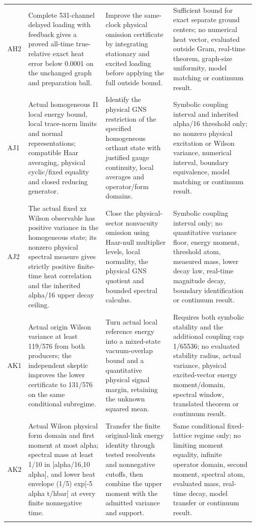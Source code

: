 \begin{longtable}{@{}>{\raggedright\arraybackslash}p{13mm}>{\raggedright\arraybackslash}p{52mm}>{\raggedright\arraybackslash}p{35mm}>{\raggedright\arraybackslash}p{48mm}@{}}
AH2 & Complete 531-channel delayed loading with feedback gives a proved all-time true-relative exact heat error below 0.0001 on the unchanged graph and preparation ball. & Improve the same-clock physical omission certificate by integrating stationary and excited loading before applying the full outside bound. & Sufficient bound for exact separate ground centers; no numerical heat vector, evaluated outside Gram, real-time theorem, graph-size uniformity, model matching or continuum result. \\ \addlinespace
AJ1 & Actual homogeneous I1 local energy bound, local trace-norm limits and normal representations; compatible Haar averaging, physical cyclic/fixed equality and closed reducing generator. & Identify the physical GNS restriction of the specified homogeneous orthant state with justified gauge continuity, local averages and operator/form domains. & Symbolic coupling interval and inherited alpha/16 threshold only; no nonzero physical excitation or Wilson variance, numerical interval, boundary equivalence, model matching or continuum result. \\ \addlinespace
AJ2 & The actual fixed xz Wilson observable has positive variance in the homogeneous state; its nonzero physical spectral measure gives strictly positive finite-time heat correlation and the inherited alpha/16 upper decay ceiling. & Close the physical-sector nonvacuity omission using Haar-null multiplier levels, local normality, the physical GNS quotient and bounded spectral calculus. & Symbolic coupling interval only; no quantitative variance floor, energy moment, threshold atom, measured mass, lower decay law, real-time magnitude decay, boundary identification or continuum result. \\ \addlinespace
AK1 & Actual origin Wilson variance at least 119/576 from both producers; the independent skeptic improves the lower certificate to 131/576 on the same conditional subregime. & Turn actual local reference energy into a mixed-state vacuum-overlap bound and a quantitative physical signal margin, retaining the unknown squared mean. & Requires both symbolic stability and the additional coupling cap 1/65536; no evaluated stability radius, actual variance, physical excited-vector energy moment/domain, spectral window, translated theorem or continuum result. \\ \addlinespace
AK2 & Actual Wilson physical form domain and first moment at most alpha; spectral mass at least 1/10 in [alpha/16,10 alpha], and lower heat envelope (1/5) exp[-5 alpha t/hbar] at every finite nonnegative time. & Transfer the finite original-link energy identity through tested resolvents and nonnegative cutoffs, then combine the upper moment with the admitted variance and support. & Same conditional fixed-lattice regime only; no limiting moment equality, infinite operator domain, second moment, spectral atom, evaluated mass, real-time decay, model transfer or continuum result. \\ \addlinespace
\bottomrule
\end{longtable}
\endgroup
